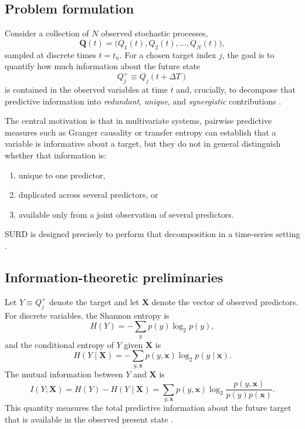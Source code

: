 \documentclass[fleqn,usenatbib]{mnras}
\begin{document}
\subsection{Problem formulation}

Consider a collection of \(N\) observed stochastic processes,
\begin{equation}
\mathbf{Q}(t)=\bigl(Q_1(t),Q_2(t),\ldots,Q_N(t)\bigr),
\end{equation}
sampled at discrete times \(t=t_n\). For a chosen target index \(j\), the goal is to quantify how much information about the future state
\begin{equation}
Q_j^+ \equiv Q_j(t+\Delta T)
\end{equation}
is contained in the observed variables at time \(t\) and, crucially, to decompose that predictive information into \emph{redundant}, \emph{unique}, and \emph{synergistic} contributions \cite{MartinezSanchez2024SURD}.

The central motivation is that in multivariate systems, pairwise predictive measures such as Granger causality or transfer entropy can establish that a variable is informative about a target, but they do not in general distinguish whether that information is:
\begin{enumerate}
    \item unique to one predictor,
    \item duplicated across several predictors, or
    \item available only from a joint observation of several predictors.
\end{enumerate}
SURD is designed precisely to perform that decomposition in a time-series setting \cite{MartinezSanchez2024SURD,Schreiber2000,WilliamsBeer2010}.

\subsection{Information-theoretic preliminaries}

Let \(Y\equiv Q_j^+\) denote the target and let \(\mathbf{X}\) denote the vector of observed predictors. For discrete variables, the Shannon entropy is
\begin{equation}
H(Y)=-\sum_{y} p(y)\log_2 p(y),
\end{equation}
and the conditional entropy of \(Y\) given \(\mathbf{X}\) is
\begin{equation}
H(Y\mid \mathbf{X})=-\sum_{y,\mathbf{x}} p(y,\mathbf{x})\log_2 p(y\mid \mathbf{x}).
\end{equation}
The mutual information between \(Y\) and \(\mathbf{X}\) is
\begin{equation}
I(Y;\mathbf{X})=H(Y)-H(Y\mid \mathbf{X})
=\sum_{y,\mathbf{x}} p(y,\mathbf{x})
\log_2\frac{p(y,\mathbf{x})}{p(y)p(\mathbf{x})}.
\label{eq:mi_total}
\end{equation}
This quantity measures the total predictive information about the future target that is available in the observed present state \cite{Shannon1948,CoverThomas2006}.
\end{document}
